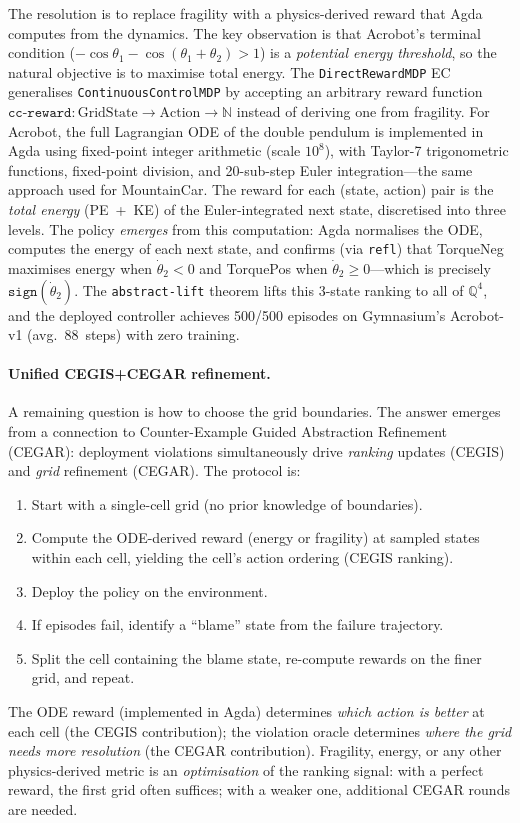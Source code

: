 \documentclass[9pt,a4paper]{article}
\theoremstyle{plain}
\theoremstyle{definition}
\theoremstyle{remark}
\begin{document}
The resolution is to replace fragility with a physics-derived reward that Agda computes from the dynamics.  The key observation is that Acrobot's terminal condition ($-\cos\theta_1 - \cos(\theta_1{+}\theta_2) > 1$) is a \emph{potential energy threshold}, so the natural objective is to maximise total energy.  The \texttt{DirectRewardMDP} EC generalises \texttt{ContinuousControlMDP} by accepting an arbitrary reward function $\texttt{cc-reward} : \text{GridState} \to \text{Action} \to \mathbb{N}$ instead of deriving one from fragility.  For Acrobot, the full Lagrangian ODE of the double pendulum is implemented in Agda using fixed-point integer arithmetic (scale $10^8$), with Taylor-7 trigonometric functions, fixed-point division, and 20-sub-step Euler integration---the same approach used for MountainCar.  The reward for each (state, action) pair is the \emph{total energy} (PE~+~KE) of the Euler-integrated next state, discretised into three levels.  The policy \emph{emerges} from this computation: Agda normalises the ODE, computes the energy of each next state, and confirms (via \texttt{refl}) that TorqueNeg maximises energy when $\dot\theta_2 < 0$ and TorquePos when $\dot\theta_2 \ge 0$---which is precisely $\texttt{sign}(\dot\theta_2)$.  The \texttt{abstract-lift} theorem lifts this 3-state ranking to all of $\mathbb{Q}^4$, and the deployed controller achieves 500/500 episodes on Gymnasium's Acrobot-v1 (avg.\ 88~steps) with zero training.

\paragraph{Unified CEGIS+CEGAR refinement.}
A remaining question is how to choose the grid boundaries.  The answer emerges from a connection to Counter-Example Guided Abstraction Refinement (CEGAR): deployment violations simultaneously drive \emph{ranking} updates (CEGIS) and \emph{grid} refinement (CEGAR).  The protocol is:
\begin{enumerate}
\item Start with a single-cell grid (no prior knowledge of boundaries).
\item Compute the ODE-derived reward (energy or fragility) at sampled states within each cell, yielding the cell's action ordering (CEGIS ranking).
\item Deploy the policy on the environment.
\item If episodes fail, identify a ``blame'' state from the failure trajectory.
\item Split the cell containing the blame state, re-compute rewards on the finer grid, and repeat.
\end{enumerate}
The ODE reward (implemented in Agda) determines \emph{which action is better} at each cell (the CEGIS contribution); the violation oracle determines \emph{where the grid needs more resolution} (the CEGAR contribution).  Fragility, energy, or any other physics-derived metric is an \emph{optimisation} of the ranking signal: with a perfect reward, the first grid often suffices; with a weaker one, additional CEGAR rounds are needed.
\end{document}
